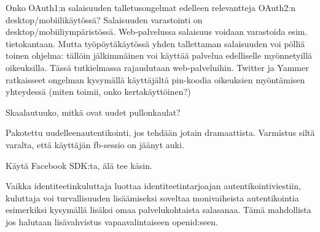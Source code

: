 \documentclass[finnish,gradu]{tktltiki}
\begin{document}
  Onko OAuth1:n salaisuuden talletusongelmat edelleen relevantteja OAuth2:n desktop/mobiilikäytössä?
  Salaisuuden varastointi on desktop/mobiiliympäristössä. Web-palvelussa salaisuus voidaan varastoida esim. tietokantaan. Mutta työpöytäkäytössä yhden tallettaman salaisuuden voi pölliä toinen ohjelma: tällöin jälkimmäinen voi käyttää palvelua edelliselle myönnetyillä oikeuksilla. Tässä tutkielmassa rajaudutaan web-palveluihin. Twitter ja Yammer ratkaisseet ongelman kysymällä käyttäjältä pin-koodia oikeuksien myöntämisen yhteydessä (miten toimii, onko kertakäyttöinen?) %

  Skaalautuuko, mitkä ovat uudet pullonkaulat?

  Pakotettu uudelleenautentikointi, jos tehdään jotain dramaattista. Varmistus siltä varalta, että käyttäjän fb-sessio on jäänyt auki.

  Käytä Facebook SDK:ta, älä tee käsin.



  Vaikka identiteetinkuluttaja luottaa identiteetintarjoajan autentikointiviestiin, kuluttaja voi turvallisuuden lisäämiseksi soveltaa monivaiheista autentikointia esimerkiksi kysymällä lisäksi omaa palvelukohtaista salasanaa. Tämä mahdollista jos halutaan lisävahvistus vapaavalintaiseen openid:seen.


\end{document}
